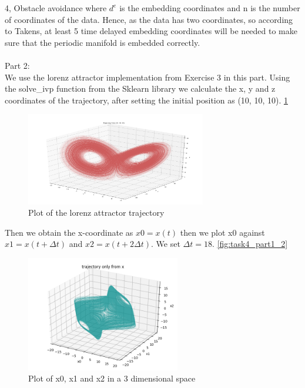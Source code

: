 \documentclass[10pt,a4paper]{article}
\begin{document}
\begin{task}{4, Obstacle avoidance}
where $d^{e}$ is the embedding coordinates and n is the number of coordinates of the data. Hence, as the data has two coordinates, so according to Takens, at least 5 time delayed embedding coordinates will be needed to make sure that the periodic manifold is embedded correctly. \\\\

Part 2: \\
We use the lorenz attractor implementation from Exercise 3 in this part. Using the solve\_ivp function from the Sklearn library we calculate the x, y and z coordinates of the trajectory, after setting the initial position as (10, 10, 10). \ref{fig:task4_part2_1}

\begin{figure}[H]
\centering
\includegraphics[width=0.7\textwidth]{../plots/task4_part2_1.png}
\caption{Plot of the lorenz attractor trajectory}
\label{fig:task4_part2_1}
\end{figure}

Then we obtain the x-coordinate as $x0 = x(t)$ then we plot x0 against $x1 = x(t + \Delta t)$ and $x2 = x(t + 2\Delta t)$. We set $\Delta t = 18$. \ref{fig:task4_part1_2}

\begin{figure}[H]
\centering
\includegraphics[width=0.6\textwidth]{../plots/task4_part2_2.png}
\caption{Plot of x0, x1 and x2 in a 3 dimensional space}
\label{fig:task4_part2_2}
\end{figure}


\end{task}
\end{document}
